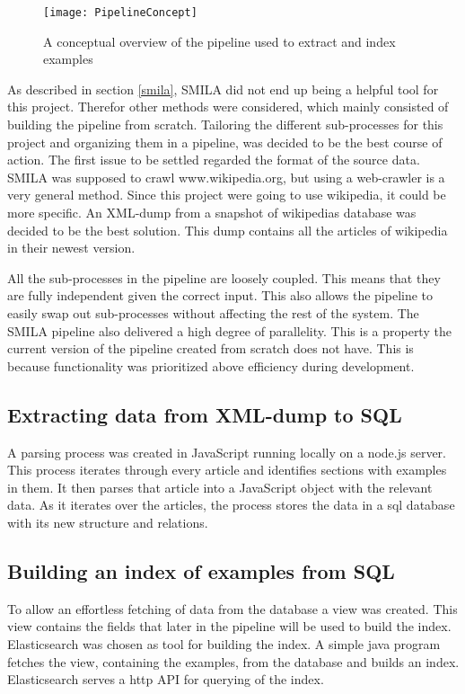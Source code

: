 \begin{figure}[h]
\caption{A conceptual overview of the pipeline used to extract and index examples}
\texttt{[image: PipelineConcept]}
\end{figure}



As described in section \ref{smila}, SMILA did not end up being a helpful tool for this project. Therefor other methods were considered, which mainly consisted of building the pipeline from scratch. Tailoring the different sub-processes for this project and organizing them in a pipeline, was decided to be the best course of action. The first issue to be settled regarded the format of the source data. SMILA was supposed to crawl www.wikipedia.org, but using a web-crawler is a very general method. Since this project were going to use wikipedia, it could be more specific. An XML-dump from a snapshot of wikipedias database was decided to be the best solution. This dump contains all the articles of wikipedia in their newest version.

All the sub-processes in the pipeline are loosely coupled. This means that they are fully independent given the correct input. This also allows the pipeline to easily swap out sub-processes without affecting the rest of the system. The SMILA pipeline also delivered a high degree of parallelity. This is a property the current version of the pipeline created from scratch does not have. This is because functionality was prioritized above efficiency during development. 

\subsection{Extracting data from XML-dump to SQL}
A parsing process was created in JavaScript running locally on a node.js server. This process iterates through every article and identifies sections with examples in them. It then parses that article into a JavaScript object with the relevant data. As it iterates over the articles, the process stores the data in a sql database with its new structure and relations. 

\subsection{Building an index of examples from SQL}



To allow an effortless fetching of data from the database a view was created. This view contains the fields that later in the pipeline will be used to build the index. Elasticsearch was chosen as tool for building the index. A simple java program fetches the view, containing the examples, from the database and builds an index. Elasticsearch serves a http API for querying of the index.



